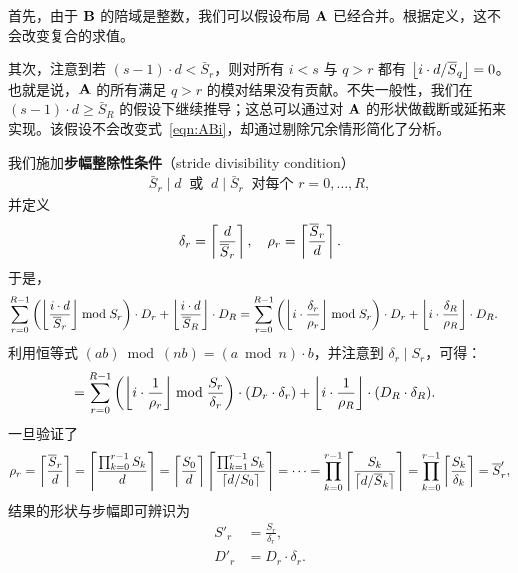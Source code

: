 首先，由于 $\mathbf{B}$ 的陪域是整数，我们可以假设布局 $\mathbf{A}$ 已经合并。根据定义，这不会改变复合的求值。

其次，注意到若 $(s-1) \cdot d < \bar{S}_r$，则对所有 $i < s$ 与 $q > r$ 都有 $\left\lfloor {i \cdot d / \overline{S}_q} \right\rfloor = 0$。也就是说，$\mathbf{A}$ 的所有满足 $q > r$ 的模对结果没有贡献。不失一般性，我们在 $(s-1) \cdot d \geq \bar{S}_R$ 的假设下继续推导；这总可以通过对 $\mathbf{A}$ 的形状做截断或延拓来实现。该假设不会改变式~\eqref{eqn:ABi}，却通过剔除冗余情形简化了分析。

我们施加{\bf 步幅整除性条件}（stride divisibility condition）
\begin{align}
\bar{S}_r \mid d \ \text{ 或 } \ d \mid \bar{S}_r \ \text{ 对每个 } r = 0, \ldots, R,
\label{eqn:divis_stride}
\end{align}
并定义
\begin{align*}
\delta_r = \left\lceil {\frac{d}{\overline{S}_r}} \right\rceil, \quad \rho_r = \left\lceil {\frac{\overline{S}_r}{d}} \right\rceil.
\end{align*}
于是，
\begin{align*}
\sum_{r=0}^{R-1} \left(\left\lfloor {\frac{i \cdot d}{\overline{S}_r}} \right\rfloor \bmod S_r\right) \cdot D_r + \left\lfloor {\frac{i \cdot d}{\overline{S}_R}} \right\rfloor \cdot D_R &=
\sum_{r=0}^{R-1} \left(\left\lfloor {i \cdot \frac{\delta_r}{\rho_r}} \right\rfloor \bmod S_r\right) \cdot D_r + \left\lfloor {i \cdot \frac{\delta_R}{\rho_R}} \right\rfloor \cdot D_R.
\end{align*}
利用恒等式 $(a b) \bmod (n b) = (a \bmod n) \cdot b$，并注意到 $\delta_r \mid S_r$，可得：
\begin{align*}
&= \sum_{r=0}^{R-1} \left(\left\lfloor {i \cdot \frac{1}{\rho_r}} \right\rfloor \bmod \frac{S_r}{\delta_r}\right) \cdot (D_r \cdot \delta_r) + \left\lfloor {i \cdot \frac{1}{\rho_R}} \right\rfloor \cdot (D_R \cdot \delta_R).
\end{align*}
一旦验证了
\begin{align*}
\rho_r = \left\lceil {\frac{\overline{S}_r}{d}} \right\rceil = \left\lceil {\frac{\prod_{k=0}^{r-1} S_k}{d}} \right\rceil = \left\lceil {\frac{S_0}{d}} \right\rceil \left\lceil {\frac{\prod_{k=1}^{r-1} S_k}{\left\lceil {d / S_0} \right\rceil}} \right\rceil = \cdots = \prod_{k=0}^{r-1} \left\lceil {\frac{S_k}{\left\lceil {d / \overline{S}_k} \right\rceil}} \right\rceil = \prod_{k=0}^{r-1} \left\lceil {\frac{S_k}{\delta_k}} \right\rceil = \overline{S}'_r,
\end{align*}
结果的形状与步幅即可辨识为
\begin{align*}
S'_r &= \frac{S_r}{\delta_r}, \\
D'_r &= D_r \cdot \delta_r.
\end{align*}

